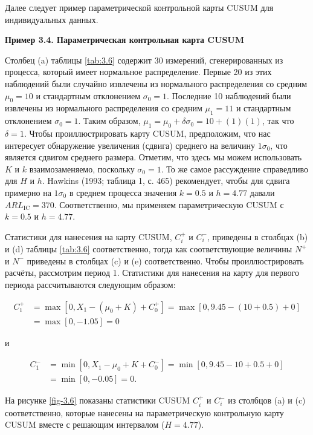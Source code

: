 Далее следует пример параметрической контрольной карты CUSUM для индивидуальных данных.

\noindent\textbf{Пример 3.4. Параметрическая контрольная карта CUSUM}

Столбец (a) таблицы \ref{tab:3.6} содержит 30 измерений, сгенерированных из процесса, который имеет нормальное распределение. Первые 20 из этих наблюдений были случайно извлечены из нормального распределения со средним \(\mu_0 = 10\) и стандартным отклонением \(\sigma_0 = 1\). Последние 10 наблюдений были извлечены из нормального распределения со средним \(\mu_1 = 11\) и стандартным отклонением \(\sigma_0 = 1\). Таким образом, \(\mu_1 = \mu_0 + \delta\sigma_0 = 10 + (1)(1)\), так что \(\delta = 1\). Чтобы проиллюстрировать карту CUSUM, предположим, что нас интересует обнаружение увеличения (сдвига) среднего на величину \(1\sigma_0\), что является сдвигом среднего размера. Отметим, что здесь мы можем использовать \(K\) и \(k\) взаимозаменяемо, поскольку \(\sigma_0 = 1\). То же самое рассуждение справедливо для \(H\) и \(h\). Hawkins (1993; таблица 1, с. 465) рекомендует, чтобы для сдвига примерно на \(1\sigma_0\) в среднем процесса значения \(k = 0.5\) и \(h = 4.77\) давали \(ARL_{\text{IC}} = 370\). Соответственно, мы применяем параметрическую CUSUM с \(k = 0.5\) и \(h = 4.77\).

Статистики для нанесения на карту CUSUM, \(C_i^+\) и \(C_i^-\), приведены в столбцах (b) и (d) таблицы \ref{tab:3.6} соответственно, тогда как соответствующие величины \(N^+\) и \(N^-\) приведены в столбцах (c) и (e) соответственно. Чтобы проиллюстрировать расчёты, рассмотрим период 1. Статистики для нанесения на карту для первого периода рассчитываются следующим образом:

\[
\begin{aligned}
	C_1^+ &= \max[0, X_1 - (\mu_0 + K) + C_0^+] = \max[0, 9.45 - (10 + 0.5) + 0] \\
	&= \max[0, -1.05] = 0
\end{aligned}
\]

и

\[
\begin{aligned}
	C_1^- &= \min[0, X_1 - \mu_0 + K + C_0^-] = \min[0, 9.45 - 10 + 0.5 + 0] \\
	&= \min[0, -0.05] = 0.
\end{aligned}
\]

На рисунке \ref{fig-3.6} показаны статистики CUSUM \(C_i^+\) и \(C_i^-\) из столбцов (a) и (c) соответственно, которые нанесены на параметрическую контрольную карту CUSUM вместе с решающим интервалом (\(H = 4.77\)).

